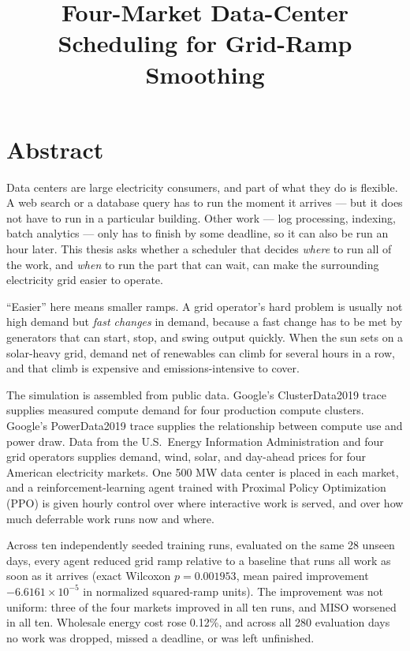 ﻿\documentclass[12pt]{article}
\title{Four-Market Data-Center Scheduling for Grid-Ramp Smoothing}
\author{}
\date{}
\begin{document}
\maketitle
\tableofcontents

\section*{Abstract}

Data centers are large electricity consumers, and part of what they do is
flexible. A web search or a database query has to run the moment it arrives ---
but it does not have to run in a particular building. Other work --- log
processing, indexing, batch analytics --- only has to finish by some deadline,
so it can also be run an hour later. This thesis asks whether a scheduler that
decides \emph{where} to run all of the work, and \emph{when} to run the part
that can wait, can make the surrounding electricity grid easier to operate.

``Easier'' here means smaller ramps. A grid operator's hard problem is usually
not high demand but \emph{fast changes} in demand, because a fast change has to
be met by generators that can start, stop, and swing output quickly. When the
sun sets on a solar-heavy grid, demand net of renewables can climb for several
hours in a row, and that climb is expensive and emissions-intensive to cover.

The simulation is assembled from public data. Google's ClusterData2019 trace
supplies measured compute demand for four production compute clusters. Google's
PowerData2019 trace supplies the relationship between compute use and power
draw. Data from the U.S.\ Energy Information Administration and four grid
operators supplies demand, wind, solar, and day-ahead prices for four American
electricity markets. One 500 MW data center is placed in each market, and a
reinforcement-learning agent trained with Proximal Policy Optimization (PPO) is
given hourly control over where interactive work is served, and over how much
deferrable work runs now and where.

Across ten independently seeded training runs, evaluated on the same 28 unseen
days, every agent reduced grid ramp relative to a baseline that runs all work
as soon as it arrives (exact Wilcoxon \(p=0.001953\), mean paired improvement
\(-6.6161\times10^{-5}\) in normalized squared-ramp units). The improvement was
not uniform: three of the four markets improved in all ten runs, and MISO
worsened in all ten. Wholesale energy cost rose 0.12\%, and across all 280
evaluation days no work was dropped, missed a deadline, or was left unfinished.
\end{document}
